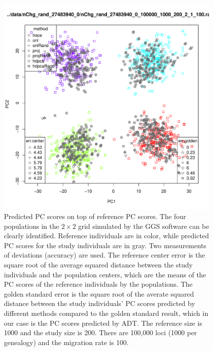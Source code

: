 \documentclass{article}
\begin{document}
\begin{figure}[p]
  \centering
  \includegraphics[width=0.98\textwidth]{n1000}
  \caption{
    Predicted PC scores on top of reference PC scores.
    The four populations in the $2 \times 2$ grid simulated by the GGS software can be clearly identified.
    Reference individuals are in color,
    while predicted PC scores for the study individuals are in gray.
    Two measurements of deviations (accuracy) are used.
    The reference center error is the square root of the average squared distance between the study individuals and the population centers, which are the means of the PC scores of the reference individuals by the populations.
    The golden standard error is the square root of the averate squared distance between the study individuals' PC scores predicted by different methods compared to the golden standard result, which in our case is the PC scores predicted by ADT.
    The reference size is 1000 and the study size is 200.
    There are 100,000 loci (1000 per genealogy) and the migration rate is 100.
  }
  \label{fig:n1000}
\end{figure}
\end{document}
